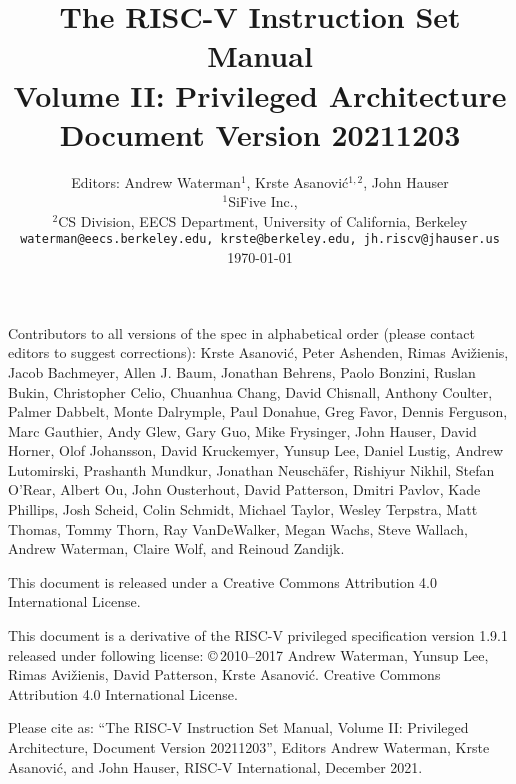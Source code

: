 \documentclass[twoside,11pt]{book}
\newcommand{\privrev}{20211203}
\newcommand{\privmonthyear}{December 2021}
\begin{document}
\title{\vspace{-0.7in}\Large {\bf The RISC-V Instruction Set Manual} \\
  \large {\bf Volume II: Privileged Architecture} \\
  Document Version \privrev
  \vspace{-0.1in}}

\author{Editors: Andrew Waterman$^{1}$, Krste Asanovi\'{c}$^{1,2}$, John Hauser \\
  $^{1}$SiFive Inc., \\
  $^{2}$CS Division, EECS Department, University of California, Berkeley \\
  {\tt waterman@eecs.berkeley.edu, krste@berkeley.edu, jh.riscv@jhauser.us} \\
  \today
}

\date{} 
\maketitle

Contributors to all versions of the spec in alphabetical order (please contact
editors to suggest corrections): Krste Asanovi\'{c}, Peter Ashenden, Rimas
Avi\v{z}ienis, Jacob Bachmeyer, Allen J. Baum, Jonathan Behrens, Paolo Bonzini, Ruslan Bukin,
Christopher Celio, Chuanhua Chang, David Chisnall, Anthony Coulter, Palmer Dabbelt, Monte
Dalrymple, Paul Donahue, Greg Favor, Dennis Ferguson,  Marc Gauthier, Andy Glew,
Gary Guo, Mike Frysinger, John Hauser, David Horner, Olof
Johansson, David Kruckemyer, Yunsup Lee, Daniel Lustig, Andrew Lutomirski, Prashanth Mundkur,
Jonathan Neusch{\"a}fer, Rishiyur
Nikhil, Stefan O'Rear, Albert Ou, John Ousterhout, David Patterson, Dmitri
Pavlov, Kade Phillips, Josh Scheid, Colin Schmidt, Michael Taylor, Wesley Terpstra, Matt Thomas, Tommy Thorn, Ray
VanDeWalker, Megan Wachs, Steve Wallach, Andrew Waterman, Claire Wolf,
and Reinoud Zandijk.

This document is released under a Creative Commons Attribution 4.0
International License.

This document is a derivative of the RISC-V
privileged specification version 1.9.1 released under following license:
\copyright \,2010--2017 Andrew Waterman, Yunsup Lee, Rimas
Avi\v{z}ienis, David Patterson, Krste Asanovi\'{c}. 
Creative Commons Attribution 4.0 International License.

Please cite as: ``The RISC-V Instruction Set
Manual, Volume II: Privileged Architecture, Document Version \privrev'', Editors
Andrew Waterman, Krste Asanovi\'{c}, and John Hauser, RISC-V International, \privmonthyear.
\end{document}
